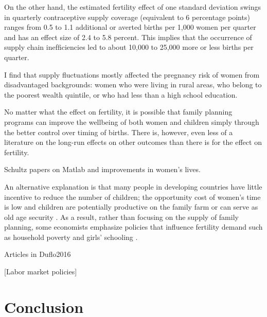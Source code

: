 \documentclass[letterpaper,12pt]{article}
\begin{document}
On the other hand, the estimated fertility effect of one standard
deviation swings in quarterly contraceptive supply coverage (equivalent
to 6 percentage points) ranges from 0.5 to 1.1 additional or averted
births per 1,000 women per quarter and has an effect size of 2.4 to 5.8
percent. This implies that the occurrence of supply chain inefﬁciencies
led to about 10,000 to 25,000 more or less births per quarter.

I ﬁnd that supply ﬂuctuations mostly affected the pregnancy risk of
women from disadvantaged backgrounds: women who were living in rural
areas, who belong to the poorest wealth quintile, or who had less than a
high school education.






No matter what the effect on fertility, it is possible that 
family planning programs can improve the wellbeing of both women and 
children simply through the better control over timing of births.
There is, however, even less of a literature on the long-run effects on
other outcomes than there is for the effect on fertility.

Schultz papers on Matlab and improvements in women's lives.

\citep{DasGupta2011}

\citet{Sinha2005}

\citep{Joshi2007}


\citep{Li2005}


\citet{Rosenzweig2009} 


An alternative explanation is that many people in developing countries 
have little incentive to reduce the number of children;
the opportunity cost of women's time is low and children are potentially 
productive on the family farm or can serve as old age security
\citep{Banerjee2014,Lambert2016}.
As a result, rather than focusing on the supply of family planning, 
some economists emphasize policies that influence fertility demand 
such as household poverty and girls' schooling 
\citep{pritchett94a,DasGupta2011}.

Articles in Duflo2016

\citet{Ainsworth1996}

[Labor market policies]


\section{Conclusion}




\end{document}

